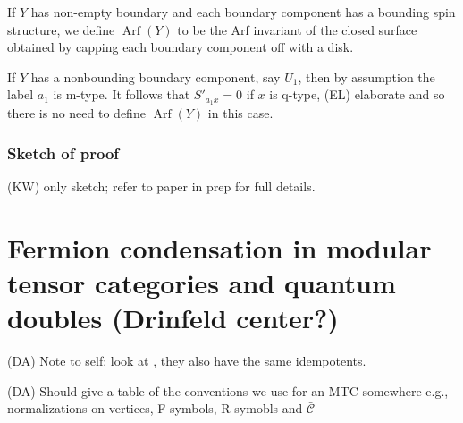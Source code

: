 \documentclass[12pt,a4paper]{article}
\newcommand{\mcc}{\mathcal{C}}
\DeclareMathOperator{\Arf}{Arf}
\newcommand{\kw}[1]{{\color{kwcolor}\footnotesize{(KW) #1}}}
\newcommand{\dave}[1]{{\color{ao(english)}\footnotesize{(DA) #1}}}
\newcommand{\ethan}[1]{{\color{amethyst}\footnotesize{(EL) #1}}}
\begin{document}
If $Y$ has non-empty boundary and each boundary component has a bounding spin structure, 
we define $\Arf(Y)$ to be the Arf invariant of the closed 
surface obtained by capping each boundary component off with a disk.

If $Y$ has a nonbounding boundary component, say $U_1$, then by assumption
the label $a_1$ is m-type.
It follows that $S'_{a_1 x} = 0$ if $x$ is q-type, \ethan{elaborate} 
and so there is no need to define $\Arf(Y)$ in this case.




\subsubsection{Sketch of proof}


\kw{only sketch; refer to paper in prep for full details.}

\section{Fermion condensation in modular tensor categories and quantum doubles (Drinfeld center?)}

\dave{Note to self: look at \cite{Koenig2010}, they also have the same idempotents.}

\dave{Should give a table of the conventions we use for an MTC somewhere
e.g., normalizations on vertices, F-symbols, R-symobls and $\bar{\mcc}$}
\end{document}

